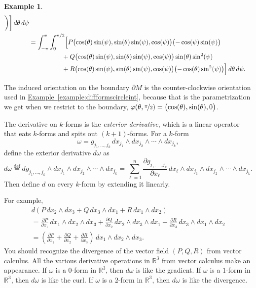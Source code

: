 \documentclass[12pt,openany]{book}
\newcommand{\R}{{\mathbb{R}}}
\newcommand{\myindex}[1]{#1\index{#1}}
\theoremstyle{plain}
\theoremstyle{remark}
\theoremstyle{definition}
\theoremstyle{exercise}
\theoremstyle{example}
\newtheorem{example}[thm]{Example}
\newcommand{\exampleref}[1]{\hyperref[#1]{Example~\ref*{#1}}}
\begin{document}
\begin{example}
\begin{equation*}
\begin{split}
\biggr)
\biggr]\, d\theta \, d\psi
\\
& =
\int_{-\pi}^\pi
\int_{0}^{\pi/2}
\Bigl[
P\bigl(\cos(\theta)\sin(\psi),\sin(\theta)\sin(\psi),\cos(\psi)\bigr)
\bigl(-\cos(\psi)\sin(\psi) \bigr)
\\
& \hspace{1.8cm}
+
Q\bigl(\cos(\theta)\sin(\psi),\sin(\theta)\sin(\psi),\cos(\psi)\bigr)
\sin(\theta)\sin^2(\psi)
\\
& \hspace{1.8cm}
+
R\bigl(\cos(\theta)\sin(\psi),\sin(\theta)\sin(\psi),\cos(\psi)\bigr) 
\bigl(-\cos(\theta)\sin^2(\psi)\bigr)
\Bigr]
\,
d\theta
\,
d\psi .
\end{split}
\end{equation*}

The induced orientation on the boundary $\partial M$
is the counter-clockwise orientation used in
\exampleref{example:diffformscircleint},
because that is the parametrization we get when we restrict
to the boundary, $\varphi(\theta,\nicefrac{\pi}{2}) =
\bigl(\cos(\theta),\sin(\theta),0\bigr)$.
\end{example}

\medskip

The derivative on $k$-forms is the
\emph{\myindex{exterior derivative}},
which is a linear operator that eats $k$-forms and spits out
$(k+1)$-forms.  For a $k$-form
\begin{equation*}
\omega =
g_{j_1,\ldots,j_k}
\,
dx_{j_1} \wedge
dx_{j_2} \wedge
\cdots \wedge
dx_{j_k}  ,
\end{equation*}
define the exterior derivative $d\omega$ as
%
\begin{equation*}
d\omega
\overset{\text{def}}{=} 
dg_{j_1,\ldots,j_k}
\wedge
dx_{j_1} \wedge
dx_{j_2} \wedge
\cdots \wedge
dx_{j_k}  =
\sum_{\ell=1}^n
\frac{\partial g_{j_1,\ldots,j_k}}{\partial x_\ell} \,
dx_\ell \wedge
dx_{j_1} \wedge
dx_{j_2} \wedge
\cdots \wedge
dx_{j_k} .
\end{equation*}
Then define $d$ on every $k$-form by extending it linearly.

For example,
\begin{multline*}
d \left(
P \, dx_2 \wedge dx_3
+
Q \, dx_3 \wedge dx_1
+
R \, dx_1 \wedge dx_2
\right)
\\
=
\frac{\partial P}{\partial x_1} \, dx_1 \wedge dx_2 \wedge dx_3
+
\frac{\partial Q}{\partial x_2} \, dx_2 \wedge dx_3 \wedge dx_1
+
\frac{\partial R}{\partial x_3} \, dx_3 \wedge dx_1 \wedge dx_2
\\
=
\left(
\frac{\partial P}{\partial x_1}
+
\frac{\partial Q}{\partial x_2} 
+
\frac{\partial R}{\partial x_3}
\right) \, dx_1 \wedge dx_2 \wedge dx_3 .
\end{multline*}
You should recognize the divergence of the vector field $(P,Q,R)$ from vector
calculus.
All the various derivative operations in $\R^3$ from vector calculus make an
appearance.
If $\omega$ is a $0$-form in $\R^3$, then $d\omega$ is like the gradient.
If $\omega$ is a $1$-form in $\R^3$, then $d\omega$ is like the curl.
If $\omega$ is a $2$-form in $\R^3$, then $d\omega$ is like the divergence.
\end{document}
